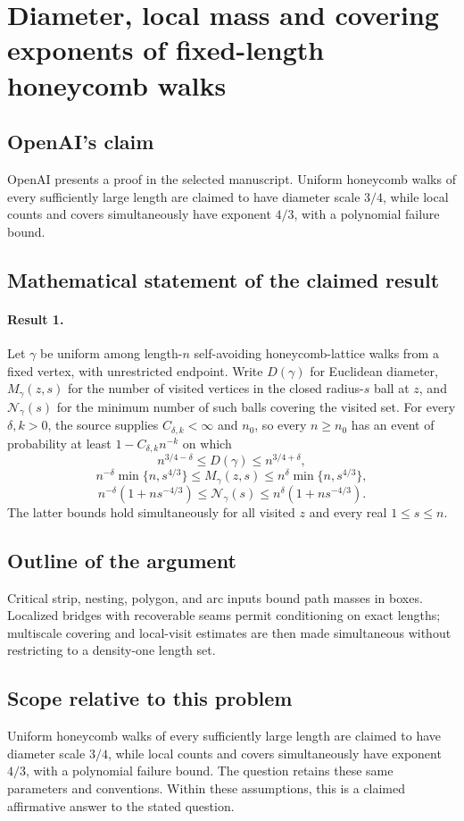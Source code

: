 \documentclass[11pt]{article}
\begin{document}
\section*{Diameter, local mass and covering exponents of fixed-length honeycomb walks}

\subsection{OpenAI's claim}
OpenAI presents a proof in the selected manuscript. Uniform honeycomb walks of every sufficiently large length are claimed to have diameter scale $3/4$, while local counts and covers simultaneously have exponent $4/3$, with a polynomial failure bound.

\subsection{Mathematical statement of the claimed result}
\paragraph{Result 1.} Let \(\gamma\) be uniform among length-\(n\) self-avoiding honeycomb-lattice walks from a fixed vertex, with unrestricted endpoint. Write \(D(\gamma)\) for Euclidean diameter, \(M_\gamma(z,s)\) for the number of visited vertices in the closed radius-\(s\) ball at \(z\), and \(\mathcal N_\gamma(s)\) for the minimum number of such balls covering the visited set. For every \(\delta,k>0\), the source supplies \(C_{\delta,k}<\infty\) and \(n_0\), so every \(n\ge n_0\) has an event of probability at least \(1-C_{\delta,k}n^{-k}\) on which
\[
 n^{3/4-\delta}\le D(\gamma)\le n^{3/4+\delta},
\]
\[
 n^{-\delta}\min\{n,s^{4/3}\}\le M_\gamma(z,s)\le n^\delta\min\{n,s^{4/3}\},
\]
\[
 n^{-\delta}(1+ns^{-4/3})\le\mathcal N_\gamma(s)\le n^\delta(1+ns^{-4/3}).
\]
The latter bounds hold simultaneously for all visited \(z\) and every real \(1\le s\le n\).

\subsection{Outline of the argument}
Critical strip, nesting, polygon, and arc inputs bound path masses in boxes. Localized bridges with recoverable seams permit conditioning on exact lengths; multiscale covering and local-visit estimates are then made simultaneous without restricting to a density-one length set.

\subsection{Scope relative to this problem}
Uniform honeycomb walks of every sufficiently large length are claimed to have diameter scale $3/4$, while local counts and covers simultaneously have exponent $4/3$, with a polynomial failure bound. The question retains these same parameters and conventions. Within these assumptions, this is a claimed affirmative answer to the stated question.
\end{document}
